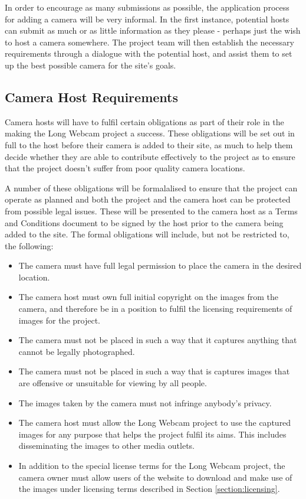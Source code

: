 \documentclass[11pt,a4paper]{article}
\begin{document}
In order to encourage as many submissions as possible, the application process for adding a camera will be very informal. In the first instance, potential hosts can submit as much or as little information as they please - perhaps just the wish to host a camera somewhere. The project team will then establish the necessary requirements through a dialogue with the potential host, and assist them to set up the best possible camera for the site's goals.
\subsection{Camera Host Requirements}
Camera hosts will have to fulfil certain obligations as part of their role in the making the Long Webcam project a success. These obligations will be set out in full to the host before their camera is added to their site, as much to help them decide whether they are able to contribute effectively to the project as to ensure that the project doesn't suffer from poor quality camera locations.

A number of these obligations will be formalalised to ensure that the project can operate as planned and both the project and the camera host can be protected from possible legal issues. These will be presented to the camera host as a Terms and Conditions document to be signed by the host prior to the camera being added to the site. The formal obligations will include, but not be restricted to, the following:

\begin{itemize}
\item The camera must have full legal permission to place the camera in the desired location.
\item The camera host must own full initial copyright on the images from the camera, and therefore be in a position to fulfil the licensing requirements of images for the project.
\item The camera must not be placed in such a way that it captures anything that cannot be legally photographed.
\item The camera must not be placed in such a way that is captures images that are offensive or unsuitable for viewing by all people.
\item The images taken by the camera must not infringe anybody's privacy.
\item The camera host must allow the Long Webcam project to use the captured images for any purpose that helps the project fulfil its aims. This includes disseminating the images to other media outlets.
\item In addition to the special license terms for the Long Webcam project, the camera owner must allow users of the website to download and make use of the images under licensing terms described in Section \ref{section:licensing}.
\end{itemize}
\end{document}
